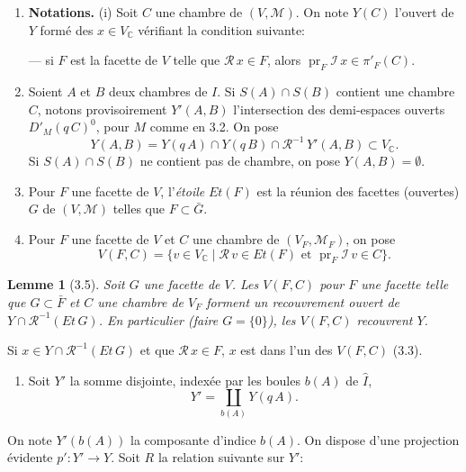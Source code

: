 \documentclass[12pt]{article}
\newtheorem{lemme}[theoreme]{Lemme}
\theoremstyle{remark}
\newcommand{\CC}{\mathbb{C}}
\begin{document}
\begin{enumerate}
\item[(3.4)] \textbf{Notations.} (i) Soit $C$ une chambre de $(V, \mathcal{M})$. On note $Y(C)$ l'ouvert de $Y$ formé des $x \in V_\CC$ vérifiant la condition suivante:

--- si $F$ est la facette de $V$ telle que $\mathscr{R} \, x \in F$, alors $\operatorname{pr}_F \mathscr{I} \, x \in \pi'_F(C)$.

\item[(ii)] Soient $A$ et $B$ deux chambres de $I$. Si $S(A) \cap S(B)$ contient une chambre $C$, notons provisoirement $Y'(A, B)$ l'intersection des demi-espaces ouverts $D'_M(q \, C)^0$, pour $M$ comme en 3.2. On pose
\[Y(A, B) = Y(q \, A) \cap Y(q \, B) \cap \mathscr{R}^{-1} \, Y'(A, B) \subset V_\CC.\]
Si $S(A) \cap S(B)$ ne contient pas de chambre, on pose $Y(A, B) = \emptyset$.

\item[(iii)] Pour $F$ une facette de $V$, l'\emph{étoile} $Et(F)$ est la réunion des facettes (ouvertes) $G$ de $(V, \mathcal{M})$ telles que $F \subset \bar{G}$.

\item[(iv)] Pour $F$ une facette de $V$ et $C$ une chambre de $(V_F, \mathcal{M}_F)$, on pose
\[V(F, C) = \{v \in V_\CC \mid \mathscr{R} \, v \in Et(F) \text{ et } \operatorname{pr}_F \mathscr{I} \, v \in C\}.\]
\end{enumerate}

\begin{lemme}[3.5]
Soit $G$ une facette de $V$. Les $V(F, C)$ pour $F$ une facette telle que $G \subset \bar{F}$ et $C$ une chambre de $V_F$ forment un recouvrement ouvert de $Y \cap \mathscr{R}^{-1}(Et \, G)$. En particulier (faire $G = \{0\}$), les $V(F, C)$ recouvrent $Y$.
\end{lemme}

Si $x \in Y \cap \mathscr{R}^{-1}(Et \, G)$ et que $\mathscr{R} \, x \in F$, $x$ est dans l'un des $V(F, C)$ (3.3).

\begin{enumerate}
\item[(3.6)] Soit $Y'$ la somme disjointe, indexée par les boules $b(A)$ de $\hat{I}$,
\[Y' = \coprod_{b(A)} Y(q \, A).\]
\end{enumerate}

On note $Y'(b(A))$ la composante d'indice $b(A)$. On dispose d'une projection évidente $p' \colon Y' \to Y$. Soit $R$ la relation suivante sur $Y'$:
\end{document}

